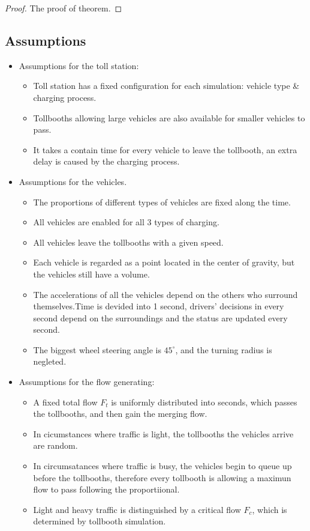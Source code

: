 \documentclass{mcmthesis}
\begin{document}
\begin{proof}
The proof of theorem.
\end{proof}

\subsection{Assumptions}

\begin{itemize}
	\item Assumptions for the toll station:
	\begin{itemize}
         \item Toll station has a fixed configuration for each simulation: vehicle type & charging process.
         \item Tollbooths allowing large vehicles are also available for smaller vehicles to pass.
         	\item It takes a contain time for every vehicle to leave the tollbooth, an extra delay is caused by the charging process.
	\end{itemize}

    \item Assumptions for the vehicles.
    \begin{itemize}
    	\item The proportions of different types of vehicles are fixed along the time.
    	\item All vehicles are enabled for all 3 types of charging.
    	\item All vehicles leave the tollbooths with a given speed.
    	\item Each vehicle is regarded as a point located in the center of gravity, but the vehicles still have a volume.
    	\item The accelerations of all the vehicles depend on the others who surround themselves.Time is devided into 1 second, drivers' decisions in every second depend on the surroundings and the status are updated every second.
    	\item The biggest wheel steering angle is $45^{\circ}$, and the turning radius is negleted.
    	
    \end{itemize}
    \item Assumptions for the flow generating:
    \begin{itemize}
    \item A fixed total flow $F_t$ is uniformly distributed into seconds, which passes the tollbooths, and then gain the merging flow.
    	\item In cicumstances where traffic is light, the tollbooths the vehicles arrive are random.
    \item In circumsatances where traffic is busy, the vehicles begin to queue up before the tollbooths, therefore every tollbooth is allowing a maximun flow to pass following the proportiional.
    \item Light and heavy traffic is distinguished by a critical flow  $F_c$, which is determined by tollbooth simulation.
    \end{itemize}
	
	
\end{itemize}
\end{document}
